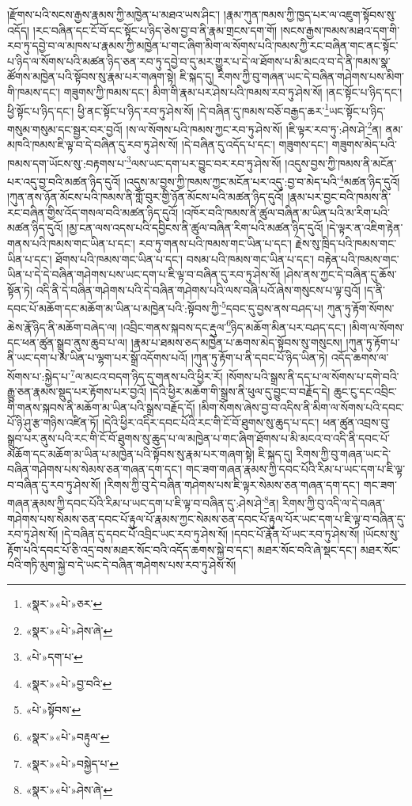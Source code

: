 །རྫོགས་པའི་སངས་རྒྱས་རྣམས་ཀྱི་མཁྱེན་པ་མཐའ་ཡས་ཤིང་། །རྣམ་ཀུན་ཁམས་ཀྱི་ཁྱད་པར་ལ་འཇུག་སྟོབས་སུ་འདོད། །རང་བཞིན་དང་ངོ་བོ་དང་སྟོང་པ་ཉིད་ཅེས་བྱ་བ་ནི་རྣམ་གྲངས་དག་གོ། །སངས་རྒྱས་ཁམས་མཐའ་དག་གི་རབ་ཏུ་དབྱེ་བ་ལ་མཁས་པ་རྣམས་ཀྱི་མཁྱེན་པ་གང་ཞིག་མིག་ལ་སོགས་པའི་ཁམས་ཀྱི་རང་བཞིན་གང་ནང་སྟོང་པ་ཉིད་ལ་སོགས་པའི་མཚན་ཉིད་ཅན་རབ་ཏུ་དབྱེ་བ་དུ་མར་གྱུར་པ་དེ་ལ་ཐོགས་པ་མི་མངའ་བ་དེ་ནི་ཁམས་སྣ་ཚོགས་མཁྱེན་པའི་སྟོབས་སུ་རྣམ་པར་གཞག་སྟེ། ཇི་སྐད་དུ། རིགས་ཀྱི་བུ་གཞན་ཡང་དེ་བཞིན་གཤེགས་པས་མིག་གི་ཁམས་དང་། གཟུགས་ཀྱི་ཁམས་དང་། མིག་གི་རྣམ་པར་ཤེས་པའི་ཁམས་རབ་ཏུ་ཤེས་སོ། །ནང་སྟོང་པ་ཉིད་དང་། ཕྱི་སྟོང་པ་ཉིད་དང་། ཕྱི་ནང་སྟོང་པ་ཉིད་རབ་ཏུ་ཤེས་སོ། །དེ་བཞིན་དུ་ཁམས་བཅོ་བརྒྱད་ཆར་\footnote{«སྣར་»«པེ་»ཅར་}ཡང་སྟོང་པ་ཉིད་གསུམ་གསུམ་དང་སྦྱར་བར་བྱའོ། །ས་ལ་སོགས་པའི་ཁམས་ཀྱང་རབ་ཏུ་ཤེས་སོ། །ཇི་ལྟར་རབ་ཏུ་:ཤེས་ཤེ་\footnote{«སྣར་»«པེ་»ཤེས་ཞེ་}ན། ནམ་མཁའི་ཁམས་ཇི་ལྟ་བ་དེ་བཞིན་དུ་རབ་ཏུ་ཤེས་སོ། །དེ་བཞིན་དུ་འདོད་པ་དང་། གཟུགས་དང་། གཟུགས་མེད་པའི་ཁམས་དག་ཡོངས་སུ་:བརྟགས་པ་\footnote{«པེ་»དག་པ་}ལས་ཡང་དག་པར་བྱུང་བར་རབ་ཏུ་ཤེས་སོ། །འདུས་བྱས་ཀྱི་ཁམས་ནི་མངོན་པར་འདུ་བྱ་བའི་མཚན་ཉིད་དུའོ། །འདུས་མ་བྱས་ཀྱི་ཁམས་ཀྱང་མངོན་པར་འདུ་:བྱ་བ་མེད་པའི་\footnote{«སྣར་»«པེ་»བྱ་བའི་}མཚན་ཉིད་དུའོ། །ཀུན་ནས་ཉོན་མོངས་པའི་ཁམས་ནི་གློ་བུར་གྱི་ཉོན་མོངས་པའི་མཚན་ཉིད་དུའོ། །རྣམ་པར་བྱང་བའི་ཁམས་ནི་རང་བཞིན་གྱིས་འོད་གསལ་བའི་མཚན་ཉིད་དུའོ། །འཁོར་བའི་ཁམས་ནི་ཚུལ་བཞིན་མ་ཡིན་པའི་མ་རིག་པའི་མཚན་ཉིད་དུའོ། །མྱ་ངན་ལས་འདས་པའི་དབྱིངས་ནི་ཚུལ་བཞིན་རིག་པའི་མཚན་ཉིད་དུའོ། །དེ་ལྟར་ན་འཇིག་རྟེན་གནས་པའི་ཁམས་གང་ཡིན་པ་དང་། རབ་ཏུ་གནས་པའི་ཁམས་གང་ཡིན་པ་དང་། རྗེས་སུ་ཁྲིད་པའི་ཁམས་གང་ཡིན་པ་དང་། ཐོགས་པའི་ཁམས་གང་ཡིན་པ་དང་། བསམ་པའི་ཁམས་གང་ཡིན་པ་དང་། བརྟེན་པའི་ཁམས་གང་ཡིན་པ་དེ་དེ་བཞིན་གཤེགས་པས་ཡང་དག་པ་ཇི་ལྟ་བ་བཞིན་དུ་རབ་ཏུ་ཤེས་སོ། །ཤེས་ནས་ཀྱང་དེ་བཞིན་དུ་ཆོས་སྟོན་ཏེ། འདི་ནི་དེ་བཞིན་གཤེགས་པའི་དེ་བཞིན་གཤེགས་པའི་ལས་བཞི་པའོ་ཞེས་གསུངས་པ་ལྟ་བུའོ། །ད་ནི་དབང་པོ་མཆོག་དང་མཆོག་མ་ཡིན་པ་མཁྱེན་པའི་:སྟོབས་ཀྱི་\footnote{«པེ་»སྟོབས་}དབང་དུ་བྱས་ནས་བཤད་པ། ཀུན་ཏུ་རྟོག་སོགས་ཆེས་རྣོ་ཉིད་ནི་མཆོག་བཞེད་ལ། །འབྲིང་གནས་སྐབས་དང་རྡུལ་\footnote{«སྣར་»«པེ་»བརྟུལ་}ཉིད་མཆོག་མིན་པར་བཤད་དང་། །མིག་ལ་སོགས་དང་ཕན་ཚུན་སྒྲུབ་ནུས་ཆུབ་པ་ལ། །རྣམ་པ་ཐམས་ཅད་མཁྱེན་པ་ཆགས་མེད་སྟོབས་སུ་གསུངས། །ཀུན་ཏུ་རྟོག་པ་ནི་ཡང་དག་པ་མ་ཡིན་པ་ལྷག་པར་སྒྲོ་འདོགས་པའོ། །ཀུན་ཏུ་རྟོག་པ་ནི་དབང་པོ་ཉིད་ཡིན་ཏེ། འདོད་ཆགས་ལ་སོགས་པ་:སྐྱེད་པ་\footnote{«སྣར་»«པེ་»བསྐྱེད་པ་}ལ་མངའ་བདག་ཉིད་དུ་གནས་པའི་ཕྱིར་རོ། །སོགས་པའི་སྒྲས་ནི་དད་པ་ལ་སོགས་པ་དགེ་བའི་རྒྱུ་ཅན་རྣམས་སྡུད་པར་རྟོགས་པར་བྱའོ། །དེའི་ཕྱིར་མཆོག་གི་སྒྲས་ནི་ཕུལ་དུ་བྱུང་བ་བརྗོད་དེ། ཆུང་ངུ་དང་འབྲིང་གི་གནས་སྐབས་ནི་མཆོག་མ་ཡིན་པའི་སྒྲས་བརྗོད་དོ། །མིག་སོགས་ཞེས་བྱ་བ་འདིས་ནི་མིག་ལ་སོགས་པའི་དབང་པོ་ཉི་ཤུ་རྩ་གཉིས་འཛིན་ཏོ། །དེའི་ཕྱིར་འདིར་དབང་པོའི་རང་གི་ངོ་བོ་ཐུགས་སུ་ཆུད་པ་དང་། ཕན་ཚུན་འབྲས་བུ་སྒྲུབ་པར་ནུས་པའི་རང་གི་ངོ་བོ་ཐུགས་སུ་ཆུད་པ་ལ་མཁྱེན་པ་གང་ཞིག་ཐོགས་པ་མི་མངའ་བ་འདི་ནི་དབང་པོ་མཆོག་དང་མཆོག་མ་ཡིན་པ་མཁྱེན་པའི་སྟོབས་སུ་རྣམ་པར་གཞག་སྟེ། ཇི་སྐད་དུ། རིགས་ཀྱི་བུ་གཞན་ཡང་དེ་བཞིན་གཤེགས་པས་སེམས་ཅན་གཞན་དག་དང་། གང་ཟག་གཞན་རྣམས་ཀྱི་དབང་པོའི་རིམ་པ་ཡང་དག་པ་ཇི་ལྟ་བ་བཞིན་དུ་རབ་ཏུ་ཤེས་སོ། །རིགས་ཀྱི་བུ་དེ་བཞིན་གཤེགས་པས་ཇི་ལྟར་སེམས་ཅན་གཞན་དག་དང་། གང་ཟག་གཞན་རྣམས་ཀྱི་དབང་པོའི་རིམ་པ་ཡང་དག་པ་ཇི་ལྟ་བ་བཞིན་དུ་:ཤེས་ཤེ་\footnote{«སྣར་»«པེ་»ཤེས་ཞེ་}ན། རིགས་ཀྱི་བུ་འདི་ལ་དེ་བཞན་གཤེགས་པས་སེམས་ཅན་དབང་པོ་རྟུལ་པོ་རྣམས་ཀྱང་སེམས་ཅན་དབང་པོ་རྟུལ་པོར་ཡང་དག་པ་ཇི་ལྟ་བ་བཞིན་དུ་རབ་ཏུ་ཤེས་སོ། །དེ་བཞིན་དུ་དབང་པོ་འབྲིང་ཡང་རབ་ཏུ་ཤེས་སོ། །དབང་པོ་རྣོན་པོ་ཡང་རབ་ཏུ་ཤེས་སོ། །ཡོངས་སུ་རྟོག་པའི་དབང་པོ་ཅི་འདྲ་བས་མཐར་སོང་བའི་འདོད་ཆགས་སྐྱེ་བ་དང་། མཐར་སོང་བའི་ཞེ་སྡང་དང་། མཐར་སོང་བའི་གཏི་མུག་སྐྱེ་བ་དེ་ཡང་དེ་བཞིན་གཤེགས་པས་རབ་ཏུ་ཤེས་སོ། 